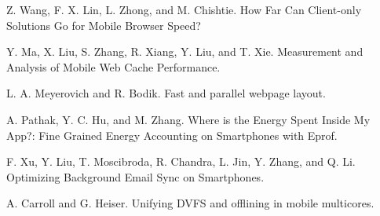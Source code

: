 \documentclass{sig-alternate-05-2015}
\begin{document}
\begin{thebibliography}{1}
	\newblock Z. Wang, F. X. Lin, L. Zhong, and M. Chishtie. How Far Can Client-only Solutions Go for Mobile Browser Speed?
	\newblock {}
	
	\newblock Y. Ma, X. Liu, S. Zhang, R. Xiang, Y. Liu, and T. Xie. Measurement and Analysis of Mobile Web Cache Performance.
	\newblock {}
	
	\newblock L. A. Meyerovich and R. Bodik. Fast and parallel webpage layout.
	\newblock {}
	
	\newblock A. Pathak, Y. C. Hu, and M. Zhang. Where is the Energy Spent Inside My App?: Fine Grained Energy Accounting on Smartphones with Eprof.
	\newblock {}
	
	\newblock F. Xu, Y. Liu, T. Moscibroda, R. Chandra, L. Jin, Y. Zhang, and Q. Li. Optimizing Background Email Sync on Smartphones.
	\newblock {}
	
	\newblock A. Carroll and G. Heiser. Unifying DVFS and offlining in mobile multicores.
	\newblock {}
	
\end{thebibliography}
\end{document}
